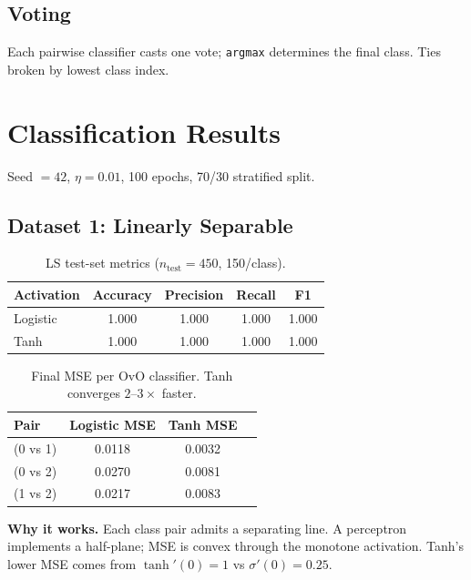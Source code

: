 \documentclass[11pt,a4paper]{article}
\newcommand{\code}[1]{\texttt{\small #1}}
\begin{document}
\subsection{Voting}
Each pairwise classifier casts one vote; \code{argmax} determines the final class.
Ties broken by lowest class index.

\section{Classification Results}\label{sec:ls-results}

Seed $= 42$, $\eta = 0.01$, 100 epochs, 70/30 stratified split.

\subsection{Dataset 1: Linearly Separable}

\begin{table}[H]
\centering
\begin{tabular}{lcccc}
\toprule
Activation & Accuracy & Precision & Recall & F1 \\
\midrule
Logistic & 1.000 & 1.000 & 1.000 & 1.000 \\
Tanh     & 1.000 & 1.000 & 1.000 & 1.000 \\
\bottomrule
\end{tabular}
\caption{LS test-set metrics ($n_{\text{test}}=450$, 150/class).}
\label{tab:ls-metrics}
\end{table}

\begin{table}[H]
\centering
\begin{tabular}{lccc}
\toprule
Pair & Logistic MSE & Tanh MSE \\
\midrule
(0 vs 1) & 0.0118 & 0.0032 \\
(0 vs 2) & 0.0270 & 0.0081 \\
(1 vs 2) & 0.0217 & 0.0083 \\
\bottomrule
\end{tabular}
\caption{Final MSE per OvO classifier. Tanh converges $2$--$3\times$ faster.}
\label{tab:ls-mse}
\end{table}

\textbf{Why it works.} Each class pair admits a separating line. A perceptron implements
a half-plane; MSE is convex through the monotone activation. Tanh's lower MSE comes from
$\tanh'(0)=1$ vs $\sigma'(0)=0.25$.
\end{document}

